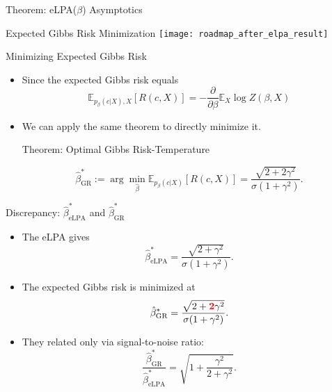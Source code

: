 \documentclass[presentation,12pt]{beamer}
\newcommand{\setroadmapfootline}{%
\setfootline{%
  \textcolor{gray!60}{%
    \tiny\insertshortdate \hfill \insertshortauthor \quad 
    \phantom{\insertframenumber/\inserttotalframenumber}
  }%
}%
}
\newcommand{\Expct}{\mathbb{E}}
\begin{document}
\begin{frame}{Theorem: eLPA($\beta$) Asymptotics}

\end{frame}

{\setroadmapfootline \begin{frame}[noframenumbering]{Expected Gibbs Risk Minimization}
\centering
\texttt{[image: roadmap\_after\_elpa\_result]} 
\end{frame}}


\begin{frame}{Minimizing Expected Gibbs Risk}
  \begin{itemize}
    \item<+-> Since the expected Gibbs risk equals
    \[
      \Expct_{p_\beta(c|X), X}[R(c,X)] = - \frac{\partial}{\partial \beta} \Expct_X \log Z(\beta, X)
    \]
    \item<+-> We can apply the same theorem to directly minimize it. 
    \begin{block}{\rule[-0.6ex]{0pt}{2.5ex}Theorem: Optimal Gibbs Risk-Temperature}
      \[
        \hat{\beta}^*_{\mathrm{GR}} 
          := \arg \min_{\hat \beta} \Expct_{p_\beta(c|X)}[R(c,X)] 
          = \frac{\sqrt{2 +  2\gamma^2}}{\sigma(1+\gamma^2)}.
      \]
    \end{block}
  \end{itemize}
\end{frame}

\begin{frame}{Discrepancy: $\hat{\beta}^*_{\mathrm{eLPA}}$ and $\hat{\beta}^*_{\mathrm{GR}}$}
  \begin{itemize}
    \item The eLPA gives
    \[
      \hat{\beta}^*_{\mathrm{eLPA}} = \frac{\sqrt{2 + \gamma^2}}{\sigma(1+\gamma^2)}.
    \]
    \item The expected Gibbs risk is minimized at
    \[
      \hat{\beta}^*_{\mathrm{GR}} = \frac{\sqrt{2 + {\color{red} \boldsymbol 2}\gamma^2}}{\sigma(1+\gamma^2)}.
    \]
    \item They related only via signal-to-noise ratio:
    \[
      \frac{\hat{\beta}^*_{\mathrm{GR}}}{\hat{\beta}^*_{\mathrm{eLPA}}} 
        = \sqrt{1 + \frac{\gamma^2}{2+\gamma^2} }.
    \]

  \end{itemize}
\end{frame}
\end{document}
